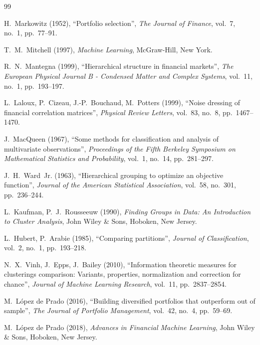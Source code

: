 \documentclass[12pt,a4paper,oneside,openany]{report}
\begin{document}
\begin{thebibliography}{99}
\setlength{\itemsep}{4pt}

H.~Markowitz (1952), ``Portfolio selection'', \textit{The Journal of Finance}, vol.~7, no.~1, pp.~77--91.

T.~M.~Mitchell (1997), \textit{Machine Learning}, McGraw-Hill, New York.

R.~N.~Mantegna (1999), ``Hierarchical structure in financial markets'', \textit{The European Physical Journal B - Condensed Matter and Complex Systems}, vol.~11, no.~1, pp.~193--197.

L.~Laloux, P.~Cizeau, J.-P.~Bouchaud, M.~Potters (1999), ``Noise dressing of financial correlation matrices'', \textit{Physical Review Letters}, vol.~83, no.~8, pp.~1467--1470.

J.~MacQueen (1967), ``Some methods for classification and analysis of multivariate observations'', \textit{Proceedings of the Fifth Berkeley Symposium on Mathematical Statistics and Probability}, vol.~1, no.~14, pp.~281--297.

J.~H.~Ward~Jr. (1963), ``Hierarchical grouping to optimize an objective function'', \textit{Journal of the American Statistical Association}, vol.~58, no.~301, pp.~236--244.

L.~Kaufman, P.~J.~Rousseeuw (1990), \textit{Finding Groups in Data: An Introduction to Cluster Analysis}, John Wiley \& Sons, Hoboken, New Jersey.

L.~Hubert, P.~Arabie (1985), ``Comparing partitions'', \textit{Journal of Classification}, vol.~2, no.~1, pp.~193--218.

N.~X.~Vinh, J.~Epps, J.~Bailey (2010), ``Information theoretic measures for clusterings comparison: Variants, properties, normalization and correction for chance'', \textit{Journal of Machine Learning Research}, vol.~11, pp.~2837--2854.

M.~López de Prado (2016), ``Building diversified portfolios that outperform out of sample'', \textit{The Journal of Portfolio Management}, vol.~42, no.~4, pp.~59--69.

M.~López de Prado (2018), \textit{Advances in Financial Machine Learning}, John Wiley \& Sons, Hoboken, New Jersey.

\end{thebibliography}
\end{document}
